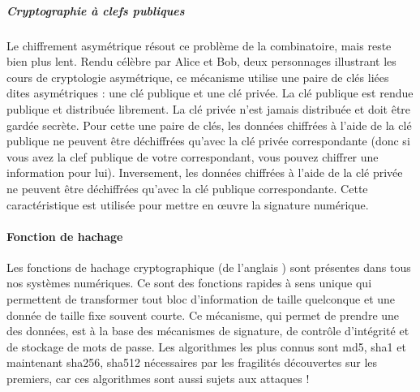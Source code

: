\subparagraph{Cryptographie à clefs publiques}
Le chiffrement asymétrique résout ce problème de la combinatoire, mais reste bien plus lent. Rendu célèbre par Alice et Bob, deux personnages illustrant les cours de cryptologie asymétrique, ce mécanisme utilise une paire de clés liées dites asymétriques : une clé publique et une clé privée. La clé publique est rendue publique et distribuée librement. La clé privée n'est jamais distribuée et doit être gardée secrète. Pour cette une paire de clés, les données chiffrées à l'aide de la clé publique ne peuvent être déchiffrées qu'avec la clé privée correspondante (donc si vous avez la clef publique de votre correspondant, vous pouvez chiffrer une information pour lui). Inversement, les données chiffrées à l'aide de la clé privée ne peuvent être déchiffrées qu'avec la clé publique correspondante. Cette caractéristique est utilisée pour mettre en œuvre la signature numérique.



\paragraph{Fonction de hachage}

Les fonctions de hachage cryptographique (de l'anglais ) sont présentes dans tous nos systèmes numériques. Ce sont des fonctions rapides à sens unique qui permettent de transformer tout bloc d'information de taille quelconque et une donnée de taille fixe souvent courte. Ce mécanisme, qui permet de prendre une  des données, est à la base des mécanismes de signature, de contrôle d'intégrité et de stockage de mots de passe. Les algorithmes les plus connus sont md5, sha1 et maintenant sha256, sha512 nécessaires par les fragilités découvertes sur les premiers, car ces algorithmes sont aussi sujets aux attaques !

